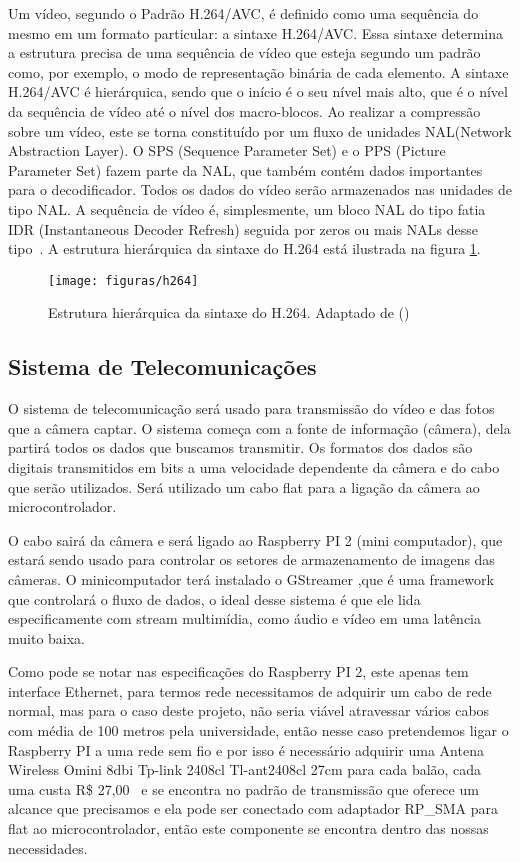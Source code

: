 		Um vídeo, segundo o Padrão H.264/AVC, é definido como uma sequência do mesmo em um formato particular: a sintaxe H.264/AVC. Essa sintaxe determina a estrutura precisa de uma sequência de vídeo que esteja segundo um padrão como, por exemplo, o modo de representação binária de cada elemento. A sintaxe H.264/AVC é hierárquica, sendo que o início é o seu nível mais alto, que é o nível da sequência de vídeo até o nível dos macro-blocos. Ao realizar a compressão sobre um vídeo, este se torna constituído por um fluxo de unidades NAL(Network Abstraction Layer). O SPS (Sequence Parameter Set) e o PPS (Picture Parameter Set) fazem parte da NAL, que também contém dados importantes para o decodificador. Todos os dados do vídeo serão armazenados nas unidades de tipo NAL. A sequência de vídeo é, simplesmente, um bloco NAL do tipo fatia IDR (Instantaneous Decoder Refresh) seguida por zeros ou mais NALs desse tipo~\cite{morais}. A estrutura hierárquica da sintaxe do H.264 está ilustrada na figura \ref{img:estruturah264}.

		\begin{figure}[H]
			\centering
			\caption[Estrutura hierárquica da sintaxe do H.264]{Estrutura hierárquica da sintaxe do H.264. Adaptado de  (\citeyear{richardson})}
			\label{img:estruturah264}
			\texttt{[image: figuras/h264]}
		\end{figure}

	\subsection{Sistema de Telecomunicações}

	O sistema de telecomunicação será usado para transmissão do vídeo e das fotos que a câmera captar. O sistema começa com a fonte de informação (câmera), dela partirá todos os dados que buscamos transmitir. Os formatos dos dados são digitais transmitidos em bits a uma velocidade dependente da câmera e do cabo que serão utilizados. Será utilizado um cabo flat para a ligação da câmera ao microcontrolador.

	O cabo sairá da câmera e será ligado ao Raspberry PI 2 (mini computador), que estará sendo usado para controlar os setores de armazenamento de imagens das câmeras. O minicomputador terá instalado o GStreamer ,que é uma framework que controlará o fluxo de dados, o ideal desse sistema é que ele lida especificamente com stream multimídia, como áudio e vídeo em uma latência muito baixa.

	Como pode se notar nas especificações do Raspberry PI 2, este apenas tem interface Ethernet, para termos rede necessitamos de adquirir um cabo de rede normal, mas para o caso deste projeto, não seria viável atravessar vários cabos com média de 100 metros pela universidade, então nesse caso pretendemos ligar o Raspberry PI a uma rede sem fio e por isso é necessário adquirir uma Antena Wireless Omini 8dbi Tp-link 2408cl Tl-ant2408cl 27cm para cada balão, cada uma custa R\$ 27,00~\cite{mercadolivre1} e se encontra no padrão de transmissão que oferece um alcance que precisamos e ela pode ser conectado com adaptador RP\_SMA para flat ao microcontrolador, então este componente se encontra dentro das nossas necessidades.

